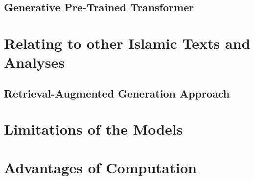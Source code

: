 \subsection{Generative Pre-Trained Transformer}
\section{Relating to other Islamic Texts and Analyses}\label{sec:ch4_relating_islamic_texts}
\subsection{Retrieval-Augmented Generation Approach}
\section{Limitations of the Models}

\section{Advantages of Computation}
